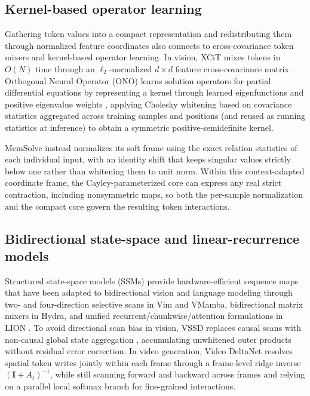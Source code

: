 \documentclass[10pt,twocolumn]{article}
\newcommand{\I}{\mathbf{I}}
\begin{document}
\subsection{Kernel-based operator learning}

Gathering token values into a compact representation and redistributing them
through normalized feature coordinates also connects to cross-covariance token
mixers and kernel-based operator learning.
In vision, XCiT mixes tokens in $O(N)$ time through an $\ell_2$-normalized
$d\times d$ feature cross-covariance matrix \cite{ali2021xcit}.
Orthogonal Neural Operator (ONO) learns solution operators for partial
differential equations by representing a kernel through learned
eigenfunctions and positive eigenvalue weights \cite{xiao2024ono}, applying
Cholesky whitening based on covariance statistics aggregated across training
samples and positions (and reused as running statistics at inference) to
obtain a symmetric positive-semidefinite kernel.

MemSolve instead normalizes its soft frame using the exact relation statistics
of each individual input, with an identity shift that keeps singular values
strictly below one rather than whitening them to unit norm.
Within this context-adapted coordinate frame, the Cayley-parameterized core
can express any real strict contraction, including nonsymmetric maps, so both
the per-sample normalization and the compact core govern the resulting token
interactions.

\subsection{Bidirectional state-space and linear-recurrence models}

Structured state-space models (SSMs) provide hardware-efficient sequence maps
\cite{gu2022s4,gu2024mamba,dao2024mamba2} that have been adapted to
bidirectional vision and language modeling through two- and four-direction
selective scans in Vim and VMamba, bidirectional matrix mixers in Hydra, and
unified recurrent/chunkwise/attention formulations in LION
\cite{zhu2024vim,liu2024vmamba,hwang2024hydra,afzal2025lion}.
To avoid directional scan bias in vision, VSSD replaces causal scans with
non-causal global state aggregation \cite{shi2025vssd}, accumulating
unwhitened outer products without residual error correction.
In video generation, Video DeltaNet \cite{xi2026videodeltanet} resolves
spatial token writes jointly within each frame through a frame-level ridge
inverse $(\I+A_t)^{-1}$, while still scanning forward and backward across
frames and relying on a parallel local softmax branch for fine-grained
interactions.
\end{document}
